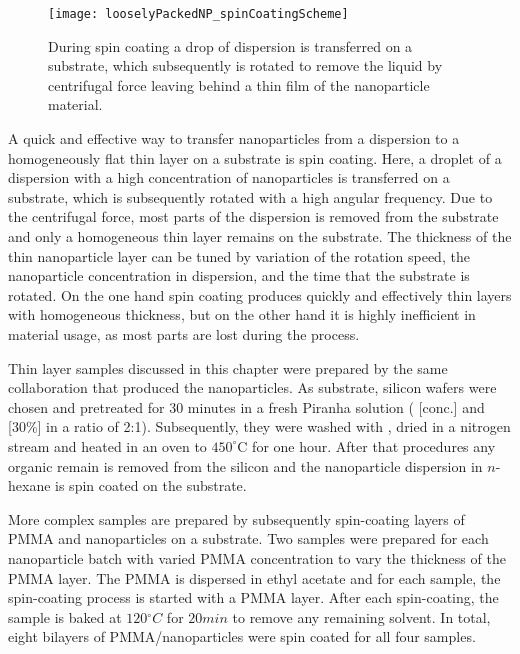 \documentclass[\main/dresen_thesis.tex]{subfiles}
\begin{document}
  \begin{figure}[tb]
    \centering
    \texttt{[image: looselyPackedNP\_spinCoatingScheme]}
    \caption{\label{fig:looselyPackedNP:preparation:spinCoatingScheme}During spin coating a drop of dispersion is transferred on a substrate, which subsequently is rotated to remove the liquid by centrifugal force leaving behind a thin film of the nanoparticle material.}
  \end{figure}

  A quick and effective way to transfer nanoparticles from a dispersion to a homogeneously flat thin layer on a substrate is spin coating.
  Here, a droplet of a dispersion with a high concentration of nanoparticles is transferred on a substrate, which is subsequently rotated with a high angular frequency.
  Due to the centrifugal force, most parts of the dispersion is removed from the substrate and only a homogeneous thin layer remains on the substrate.
  The thickness of the thin nanoparticle layer can be tuned by variation of the rotation speed, the nanoparticle concentration in dispersion, and the time that the substrate is rotated.
  On the one hand spin coating produces quickly and effectively thin layers with homogeneous thickness, but on the other hand it is highly inefficient in material usage, as most parts are lost during the process.

  Thin layer samples discussed in this chapter were prepared by the same collaboration that produced the nanoparticles.
  As substrate, silicon wafers were chosen and pretreated for 30 minutes in a fresh Piranha solution ( [conc.] and  [30\%] in a ratio of 2:1). Subsequently, they were washed with , dried in a nitrogen stream and heated in an oven to $450 ^\circ \mathrm{C}$ for one hour.
  After that procedures any organic remain is removed from the silicon and the nanoparticle dispersion in $\mathit{n}$-hexane is spin coated on the substrate.

  More complex samples are prepared by subsequently spin-coating layers of PMMA and nanoparticles on a substrate.
  Two samples were prepared for each nanoparticle batch with varied PMMA concentration to vary the thickness of the PMMA layer.
  The PMMA is dispersed in ethyl acetate and for each sample, the spin-coating process is started with a PMMA layer.
  After each spin-coating, the sample is baked at $120 \unit{^\circ C}$ for $20 \unit{min}$ to remove any remaining solvent.
  In total, eight bilayers of PMMA/nanoparticles were spin coated for all four samples.
\end{document}
